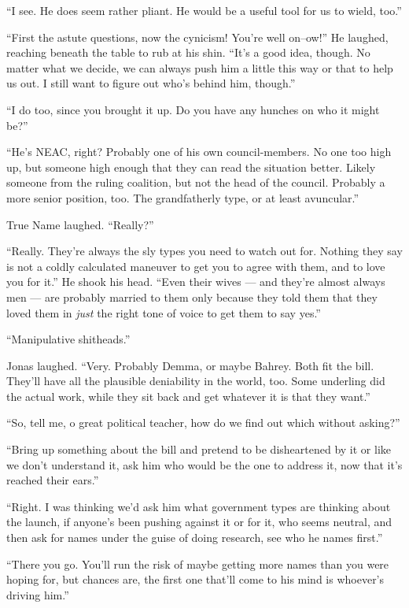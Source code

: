 ``I see. He does seem rather pliant. He would be a useful tool for us to wield, too.''

``First the astute questions, now the cynicism! You're well on--ow!'' He laughed, reaching beneath the table to rub at his shin. ``It's a good idea, though. No matter what we decide, we can always push him a little this way or that to help us out. I still want to figure out who's behind him, though.''

``I do too, since you brought it up. Do you have any hunches on who it might be?''

``He's NEAC, right? Probably one of his own council-members. No one too high up, but someone high enough that they can read the situation better. Likely someone from the ruling coalition, but not the head of the council. Probably a more senior position, too. The grandfatherly type, or at least avuncular.''

True Name laughed. ``Really?''

``Really. They're always the sly types you need to watch out for. Nothing they say is not a coldly calculated maneuver to get you to agree with them, and to love you for it.'' He shook his head. ``Even their wives — and they're almost always men — are probably married to them only because they told them that they loved them in \emph{just} the right tone of voice to get them to say yes.''

``Manipulative shitheads.''

Jonas laughed. ``Very. Probably Demma, or maybe Bahrey. Both fit the bill. They'll have all the plausible deniability in the world, too. Some underling did the actual work, while they sit back and get whatever it is that they want.''

``So, tell me, o great political teacher, how do we find out which without asking?''

``Bring up something about the bill and pretend to be disheartened by it or like we don't understand it, ask him who would be the one to address it, now that it's reached their ears.''

``Right. I was thinking we'd ask him what government types are thinking about the launch, if anyone's been pushing against it or for it, who seems neutral, and then ask for names under the guise of doing research, see who he names first.''

``There you go. You'll run the risk of maybe getting more names than you were hoping for, but chances are, the first one that'll come to his mind is whoever's driving him.''

